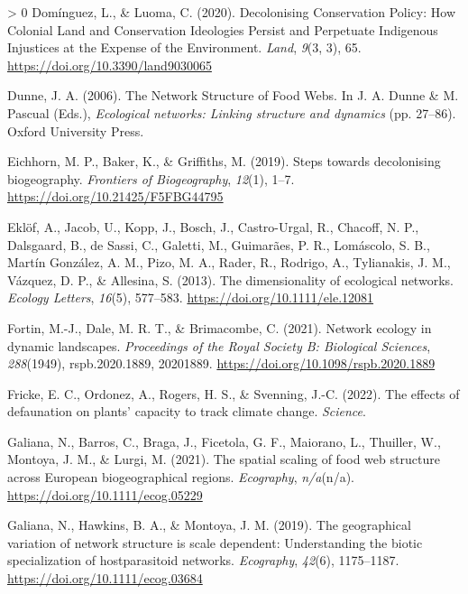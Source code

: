 \documentclass[11pt]{article}
\newlength{\cslhangindent}
\newenvironment{CSLReferences}[3] %
 {%
  \setlength{\parindent}{0pt}
  \ifodd #1 \everypar{\setlength{\hangindent}{\cslhangindent}}\ignorespaces\fi
  \ifnum #2 > 0
  \setlength{\parskip}{#2\baselineskip}
  \fi
 }%
 {}
\begin{document}
\begin{CSLReferences}{1}{0}
\leavevmode\hypertarget{ref-Dominguez2020DecCon}{}%
Domínguez, L., \& Luoma, C. (2020). Decolonising Conservation Policy:
How Colonial Land and Conservation Ideologies Persist and Perpetuate
Indigenous Injustices at the Expense of the Environment. \emph{Land},
\emph{9}(3, 3), 65. \url{https://doi.org/10.3390/land9030065}

\leavevmode\hypertarget{ref-Dunne2006NetStr}{}%
Dunne, J. A. (2006). The Network Structure of Food Webs. In J. A. Dunne
\& M. Pascual (Eds.), \emph{Ecological networks: Linking structure and
dynamics} (pp. 27--86). Oxford University Press.

\leavevmode\hypertarget{ref-Eichhorn2019SteDec}{}%
Eichhorn, M. P., Baker, K., \& Griffiths, M. (2019). Steps towards
decolonising biogeography. \emph{Frontiers of Biogeography},
\emph{12}(1), 1--7. \url{https://doi.org/10.21425/F5FBG44795}

\leavevmode\hypertarget{ref-Eklof2013DimEco}{}%
Eklöf, A., Jacob, U., Kopp, J., Bosch, J., Castro-Urgal, R., Chacoff, N.
P., Dalsgaard, B., de Sassi, C., Galetti, M., Guimarães, P. R.,
Lomáscolo, S. B., Martín González, A. M., Pizo, M. A., Rader, R.,
Rodrigo, A., Tylianakis, J. M., Vázquez, D. P., \& Allesina, S. (2013).
The dimensionality of ecological networks. \emph{Ecology Letters},
\emph{16}(5), 577--583. \url{https://doi.org/10.1111/ele.12081}

\leavevmode\hypertarget{ref-Fortin2021NetEco}{}%
Fortin, M.-J., Dale, M. R. T., \& Brimacombe, C. (2021). Network ecology
in dynamic landscapes. \emph{Proceedings of the Royal Society B:
Biological Sciences}, \emph{288}(1949), rspb.2020.1889, 20201889.
\url{https://doi.org/10.1098/rspb.2020.1889}

\leavevmode\hypertarget{ref-Fricke2022EffDef}{}%
Fricke, E. C., Ordonez, A., Rogers, H. S., \& Svenning, J.-C. (2022).
The effects of defaunation on plants' capacity to track climate change.
\emph{Science}.

\leavevmode\hypertarget{ref-Galiana2021SpaSca}{}%
Galiana, N., Barros, C., Braga, J., Ficetola, G. F., Maiorano, L.,
Thuiller, W., Montoya, J. M., \& Lurgi, M. (2021). The spatial scaling
of food web structure across European biogeographical regions.
\emph{Ecography}, \emph{n/a}(n/a).
\url{https://doi.org/10.1111/ecog.05229}

\leavevmode\hypertarget{ref-Galiana2019GeoVar}{}%
Galiana, N., Hawkins, B. A., \& Montoya, J. M. (2019). The geographical
variation of network structure is scale dependent: Understanding the
biotic specialization of hostparasitoid networks. \emph{Ecography},
\emph{42}(6), 1175--1187. \url{https://doi.org/10.1111/ecog.03684}


\end{CSLReferences}
\end{document}

